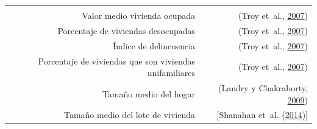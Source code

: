 \documentclass[12pt,a4paper,openany]{book}
\theoremstyle{definition}
\theoremstyle{definition}
\theoremstyle{definition}
\theoremstyle{remark}
\begin{document}
\begin{longtable}[]{@{}rr@{}}
\begin{minipage}[t]{0.31\columnwidth}
\end{minipage}\tabularnewline
\begin{minipage}[t]{0.57\columnwidth}\raggedleft\strut
Valor medio vivienda ocupada\strut
\end{minipage} & \begin{minipage}[t]{0.31\columnwidth}\raggedleft\strut
(Troy et~al., \protect\hyperlink{ref-troy_predicting_2007}{2007})\strut
\end{minipage}\tabularnewline
\begin{minipage}[t]{0.57\columnwidth}\raggedleft\strut
Porcentaje de viviendas desocupadas\strut
\end{minipage} & \begin{minipage}[t]{0.31\columnwidth}\raggedleft\strut
(Troy et~al., \protect\hyperlink{ref-troy_predicting_2007}{2007})\strut
\end{minipage}\tabularnewline
\begin{minipage}[t]{0.57\columnwidth}\raggedleft\strut
Índice de delincuencia\strut
\end{minipage} & \begin{minipage}[t]{0.31\columnwidth}\raggedleft\strut
(Troy et~al., \protect\hyperlink{ref-troy_predicting_2007}{2007})\strut
\end{minipage}\tabularnewline
\begin{minipage}[t]{0.57\columnwidth}\raggedleft\strut
Porcentaje de viviendas que son viviendas unifamiliares\strut
\end{minipage} & \begin{minipage}[t]{0.31\columnwidth}\raggedleft\strut
(Troy et~al., \protect\hyperlink{ref-troy_predicting_2007}{2007})\strut
\end{minipage}\tabularnewline
\begin{minipage}[t]{0.57\columnwidth}\raggedleft\strut
Tamaño medio del hogar\strut
\end{minipage} & \begin{minipage}[t]{0.31\columnwidth}\raggedleft\strut
(Landry y Chakraborty,
\protect\hyperlink{ref-landry_street_2009}{2009})\strut
\end{minipage}\tabularnewline
\begin{minipage}[t]{0.57\columnwidth}\raggedleft\strut
Tamaño medio del lote de vivienda\strut
\end{minipage} & \begin{minipage}[t]{0.31\columnwidth}\raggedleft\strut
{[}Shanahan et~al.
(\protect\hyperlink{ref-shanahan_socio-economic_2014}{2014}){]}\strut
\end{minipage}\tabularnewline

\end{longtable}
\end{document}
